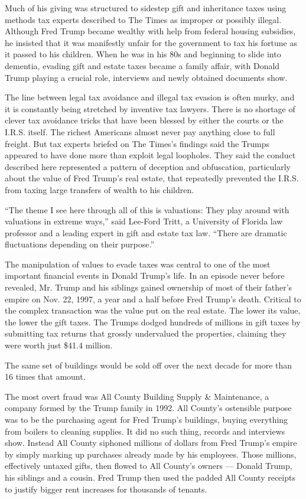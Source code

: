 Much of his giving was structured to sidestep gift and inheritance taxes
using methods tax experts described to The Times as improper or possibly
illegal. Although Fred Trump became wealthy with help from federal
housing subsidies, he insisted that it was manifestly unfair for the
government to tax his fortune as it passed to his children. When he was
in his 80s and beginning to slide into dementia, evading gift and estate
taxes became a family affair, with Donald Trump playing a crucial role,
interviews and newly obtained documents show.

The line between legal tax avoidance and illegal tax evasion is often
murky, and it is constantly being stretched by inventive tax lawyers.
There is no shortage of clever tax avoidance tricks that have been
blessed by either the courts or the I.R.S. itself. The richest Americans
almost never pay anything close to full freight. But tax experts briefed
on The Times's findings said the Trumps appeared to have done more than
exploit legal loopholes. They said the conduct described here
represented a pattern of deception and obfuscation, particularly about
the value of Fred Trump's real estate, that repeatedly prevented the
I.R.S. from taxing large transfers of wealth to his children.

``The theme I see here through all of this is valuations: They play
around with valuations in extreme ways,'' said Lee-Ford Tritt, a
University of Florida law professor and a leading expert in gift and
estate tax law. ``There are dramatic fluctuations depending on their
purpose.''

The manipulation of values to evade taxes was central to one of the most
important financial events in Donald Trump's life. In an episode never
before revealed, Mr. Trump and his siblings gained ownership of most of
their father's empire on Nov. 22, 1997, a year and a half before Fred
Trump's death. Critical to the complex transaction was the value put on
the real estate. The lower its value, the lower the gift taxes. The
Trumps dodged hundreds of millions in gift taxes by submitting tax
returns that grossly undervalued the properties, claiming they were
worth just \$41.4 million.

The same set of buildings would be sold off over the next decade for
more than 16 times that amount.

The most overt fraud was All County Building Supply \& Maintenance, a
company formed by the Trump family in 1992. All County's ostensible
purpose was to be the purchasing agent for Fred Trump's buildings,
buying everything from boilers to cleaning supplies. It did no such
thing, records and interviews show. Instead All County siphoned millions
of dollars from Fred Trump's empire by simply marking up purchases
already made by his employees. Those millions, effectively untaxed
gifts, then flowed to All County's owners --- Donald Trump, his siblings
and a cousin. Fred Trump then used the padded All County receipts to
justify bigger rent increases for thousands of tenants.

